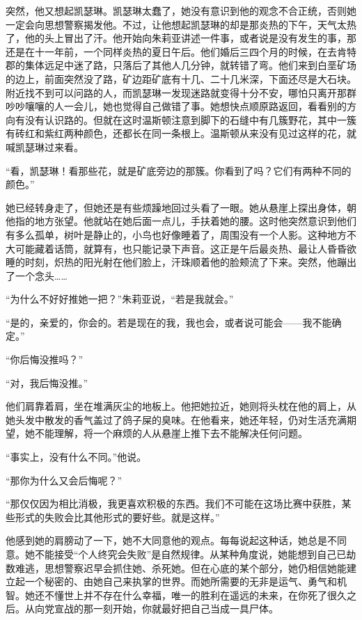 突然，他又想起凯瑟琳。凯瑟琳太蠢了，她没有意识到他的观念不合正统，否则她一定会向思想警察揭发他。不过，让他想起凯瑟琳的却是那炎热的下午，天气太热了，他的头上冒出了汗。他开始向朱莉亚讲述一件事，或者说是没有发生的事，那还是在十一年前，一个同样炎热的夏日午后。他们婚后三四个月的时候，在去肯特郡的集体远足中迷了路，只落后了其他人几分钟，就转错了弯。他们来到白垩矿场的边上，前面突然没了路，矿边距矿底有十几、二十几米深，下面还尽是大石块。附近找不到可以问路的人，而凯瑟琳一发现迷路就变得十分不安，哪怕只离开那群吵吵嚷嚷的人一会儿，她也觉得自己做错了事。她想快点顺原路返回，看看别的方向有没有认识路的。但就在这时温斯顿注意到脚下的石缝中有几簇野花，其中一簇有砖红和紫红两种颜色，还都长在同一条根上。温斯顿从来没有见过这样的花，就喊凯瑟琳过来看。

``看，凯瑟琳！看那些花，就是矿底旁边的那簇。你看到了吗？它们有两种不同的颜色。''

她已经转身走了，但她还是有些烦躁地回过头看了一眼。她从悬崖上探出身体，朝他指的地方张望。他就站在她后面一点儿，手扶着她的腰。这时他突然意识到他们有多么孤单，树叶是静止的，小鸟也好像睡着了，周围没有一个人影。这种地方不大可能藏着话筒，就算有，也只能记录下声音。这正是午后最炎热、最让人昏昏欲睡的时刻，炽热的阳光射在他们脸上，汗珠顺着他的脸颊流了下来。突然，他蹦出了一个念头\ldots\ldots{}

``为什么不好好推她一把？''朱莉亚说，``若是我就会。''

``是的，亲爱的，你会的。若是现在的我，我也会，或者说可能会------我不能确定。''

``你后悔没推吗？''

``对，我后悔没推。''

他们肩靠着肩，坐在堆满灰尘的地板上。他把她拉近，她则将头枕在他的肩上，从她头发中散发的香气盖过了鸽子屎的臭味。在他看来，她还年轻，仍对生活充满期望，她不能理解，将一个麻烦的人从悬崖上推下去不能解决任何问题。

``事实上，没有什么不同。''他说。

``那你为什么又会后悔呢？''

``那仅仅因为相比消极，我更喜欢积极的东西。我们不可能在这场比赛中获胜，某些形式的失败会比其他形式的要好些。就是这样。''

他感到她的肩膀动了一下，她不大同意他的观点。每每说起这种话，她总是不同意。她不能接受``个人终究会失败''是自然规律。从某种角度说，她能想到自己已劫数难逃，思想警察迟早会抓住她、杀死她。但在心底的某个部分，她仍相信她能建立起一个秘密的、由她自己来执掌的世界。而她所需要的无非是运气、勇气和机智。她还不懂世上并不存在什么幸福，唯一的胜利在遥远的未来，在你死了很久之后。从向党宣战的那一刻开始，你就最好把自己当成一具尸体。

